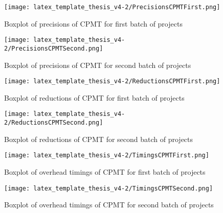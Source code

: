 \documentclass[twoside]{uva-inf-bachelor-thesis}
\begin{document}
\begin{figure}[h!]
    \centering
    \texttt{[image: latex\_template\_thesis\_v4-2/PrecisionsCPMTFirst.png]}
    \caption{Boxplot of precisions of CPMT for first batch of projects}
    \label{fig:boxplotCPMTPrecisions1}
\end{figure}
\begin{figure}[h!]
    \centering
    \texttt{[image: latex\_template\_thesis\_v4-2/PrecisionsCPMTSecond.png]}
    \caption{Boxplot of precisions of CPMT for second batch of projects}
    \label{fig:boxplotCPMTPrecisions2}
\end{figure}
\begin{figure}[h!]
    \centering
    \texttt{[image: latex\_template\_thesis\_v4-2/ReductionsCPMTFirst.png]}
    \caption{Boxplot of reductions of CPMT for first batch of projects}
    \label{fig:boxplotCPMTReductions1}
\end{figure}
\begin{figure}[h!]
    \centering
    \texttt{[image: latex\_template\_thesis\_v4-2/ReductionsCPMTSecond.png]}
    \caption{Boxplot of reductions of CPMT for second batch of projects}
    \label{fig:boxplotCPMTReductions2}
\end{figure}
\begin{figure}[h!]
    \centering
    \texttt{[image: latex\_template\_thesis\_v4-2/TimingsCPMTFirst.png]}
    \caption{Boxplot of overhead timings of CPMT for first batch of projects}
    \label{fig:boxplotCPMTTimings1}
\end{figure}
\begin{figure}[h!]
    \centering
    \texttt{[image: latex\_template\_thesis\_v4-2/TimingsCPMTSecond.png]}
    \caption{Boxplot of overhead timings of CPMT for second batch of projects}
    \label{fig:boxplotCPMTTimings2}
\end{figure}

\clearpage
\end{document}
